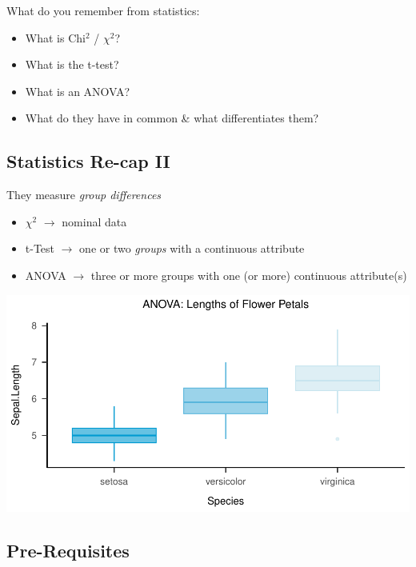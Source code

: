 \documentclass[
]{book}
\providecommand{\tightlist}{%
  \setlength{\itemsep}{0pt}\setlength{\parskip}{0pt}}
\begin{document}
What do you remember from statistics:

\begin{itemize}
\tightlist
\item
  What is Chi\(^2\) / \(\chi^2\)?
\item
  What is the t-test?
\item
  What is an ANOVA?
\item
  What do they have in common \& what differentiates them?
\end{itemize}

\subsection{\texorpdfstring{Statistics Re-cap II}{Statistics Re-cap  II}}\label{statistics-re-cap-ii}

They measure \emph{group differences}

\begin{itemize}
\tightlist
\item
  \(\chi^2\) \(\rightarrow\) nominal data
\item
  t-Test \(\rightarrow\) one or two \emph{groups} with a continuous attribute
\item
  ANOVA \(\rightarrow\) three or more groups with one (or more) continuous attribute(s)
\end{itemize}

\includegraphics{_main_files/figure-latex/unnamed-chunk-60-1.pdf}

\subsection{Pre-Requisites}\label{pre-requisites}
\end{document}
